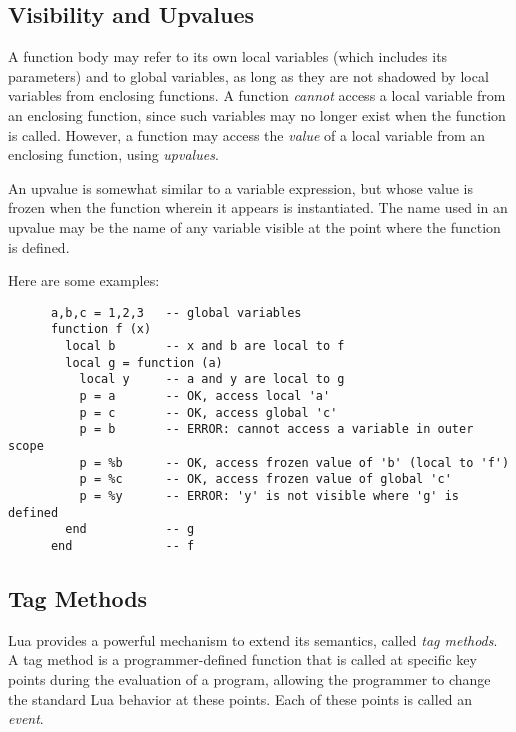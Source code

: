\documentclass[11pt]{article}
\newcommand{\Def}[1]{\emph{#1}\index{#1}}
\begin{document}
\subsection{Visibility and Upvalues} \label{upvalue}
 

A function body may refer to its own local variables
(which includes its parameters) and to global variables,
as long as they are not shadowed by local
variables from enclosing functions.
A function \emph{cannot} access a local
variable from an enclosing function,
since such variables may no longer exist when the function is called.
However, a function may access the \emph{value} of a local variable
from an enclosing function, using \emph{upvalues}.

\begin{Produc}
\end{Produc}
An upvalue is somewhat similar to a variable expression,
but whose value is frozen when the function wherein it
appears is instantiated.
The name used in an upvalue may be the name of any variable visible
at the point where the function is defined.

Here are some examples:
\begin{verbatim}
      a,b,c = 1,2,3   -- global variables
      function f (x)
        local b       -- x and b are local to f
        local g = function (a)
          local y     -- a and y are local to g
          p = a       -- OK, access local 'a'
          p = c       -- OK, access global 'c'
          p = b       -- ERROR: cannot access a variable in outer scope
          p = %b      -- OK, access frozen value of 'b' (local to 'f')
          p = %c      -- OK, access frozen value of global 'c'
          p = %y      -- ERROR: 'y' is not visible where 'g' is defined
        end           -- g
      end             -- f
\end{verbatim}


\subsection{Tag Methods} \label{tag-method}

Lua provides a powerful mechanism to extend its semantics,
called \Def{tag methods}.
A tag method is a programmer-defined function
that is called at specific key points during the evaluation of a program,
allowing the programmer to change the standard Lua behavior at these points.
Each of these points is called an \Def{event}.
\end{document}
